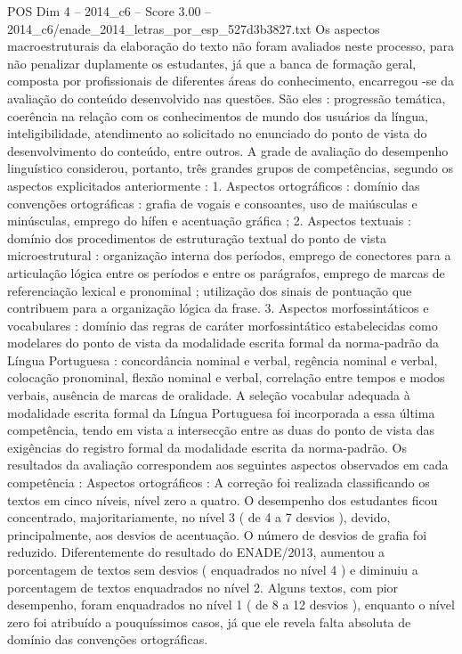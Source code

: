 \begin{textsample}{POS Dim 4 – 2014\_c6 – Score 3.00 – 2014\_c6/enade\_2014\_letras\_por\_esp\_527d3b3827.txt}
Os aspectos macroestruturais da elaboração do texto não foram avaliados neste processo, para não penalizar duplamente os estudantes, já que a banca de formação geral, composta por profissionais de diferentes áreas do conhecimento, encarregou -se da avaliação do conteúdo desenvolvido nas questões.
São eles : progressão temática, coerência na relação com os conhecimentos de mundo dos usuários da língua, inteligibilidade, atendimento ao solicitado no enunciado do ponto de vista do desenvolvimento do conteúdo, entre outros.
A grade de avaliação do desempenho linguístico considerou, portanto, três grandes grupos de competências, segundo os aspectos explicitados anteriormente : 1.
Aspectos ortográficos : domínio das convenções ortográficas : grafia de vogais e consoantes, uso de maiúsculas e minúsculas, emprego do hífen e acentuação gráfica ; 2.
Aspectos textuais : domínio dos procedimentos de estruturação textual do ponto de vista microestrutural : organização interna dos períodos, emprego de conectores para a articulação lógica entre os períodos e entre os parágrafos, emprego de marcas de referenciação lexical e pronominal ; utilização dos sinais de pontuação que contribuem para a organização lógica da frase. 3.
Aspectos morfossintáticos e vocabulares : domínio das regras de caráter morfossintático estabelecidas como modelares do ponto de vista da modalidade escrita formal da norma-padrão da Língua Portuguesa : concordância nominal e verbal, regência nominal e verbal, colocação pronominal, flexão nominal e verbal, correlação entre tempos e modos verbais, ausência de marcas de oralidade.
A seleção vocabular adequada à modalidade escrita formal da Língua Portuguesa foi incorporada a essa última competência, tendo em vista a intersecção entre as duas do ponto de vista das exigências do registro formal da modalidade escrita da norma-padrão.
Os resultados da avaliação correspondem aos seguintes aspectos observados em cada competência : Aspectos ortográficos : A correção foi realizada classificando os textos em cinco níveis, nível zero a quatro.
O desempenho dos estudantes ficou concentrado, majoritariamente, no nível 3 ( de 4 a 7 desvios ), devido, principalmente, aos desvios de acentuação.
O número de desvios de grafia foi reduzido.
Diferentemente do resultado do ENADE/2013, aumentou a porcentagem de textos sem desvios ( enquadrados no nível 4 ) e diminuiu a porcentagem de textos enquadrados no nível 2.
Alguns textos, com pior desempenho, foram enquadrados no nível 1 ( de 8 a 12 desvios ), enquanto o nível zero foi atribuído a pouquíssimos casos, já que ele revela falta absoluta de domínio das convenções ortográficas.

\end{textsample}
